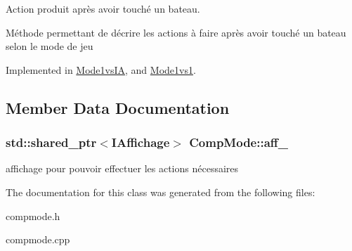 Action produit après avoir touché un bateau. 

Méthode permettant de décrire les actions à faire après avoir touché un bateau selon le mode de jeu 

Implemented in \hyperlink{class_mode1vs_i_a_a1da5810e6d744e2cbeae3ceebe6df521}{Mode1vs\+IA}, and \hyperlink{class_mode1vs1_ac94642f3b6ca6b835ded37ed3e2fbf79}{Mode1vs1}.



\subsection{Member Data Documentation}
\subsubsection[{\texorpdfstring{aff\+\_\+}{aff_}}]{\setlength{\rightskip}{0pt plus 5cm}std\+::shared\+\_\+ptr$<${\bf I\+Affichage}$>$ Comp\+Mode\+::aff\+\_\+\hspace{0.3cm}{\ttfamily [protected]}}\hypertarget{class_comp_mode_abb71bc830a23d19f68c821f4d1564488}{}\label{class_comp_mode_abb71bc830a23d19f68c821f4d1564488}
affichage pour pouvoir effectuer les actions nécessaires 

The documentation for this class was generated from the following files\+:\begin{DoxyCompactItemize}
\item 
compmode.\+h\item 
compmode.\+cpp\end{DoxyCompactItemize}

